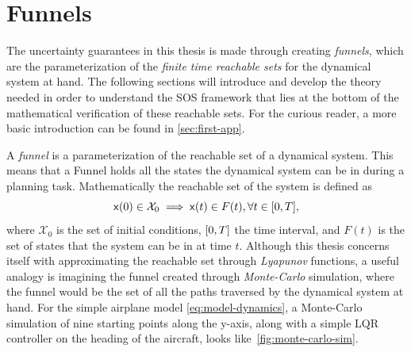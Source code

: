 \section{Funnels}
\label{sec:funnels}

The uncertainty guarantees in this thesis is made through creating
\textit{funnels}, which are the parameterization of the \textit{finite time
  reachable sets} for the dynamical system at hand. The following sections will
introduce and develop the theory needed in order to understand the \ac{SOS}
framework that lies at the bottom of the mathematical verification of these
reachable sets. For the curious reader, a more basic introduction can be found
in \cref{sec:first-app}.

A \textit{funnel} is a parameterization of the reachable set of a dynamical
system. This means that a Funnel holds all the states the dynamical system can
be in during a planning task. Mathematically the reachable set of the system is
defined as
\[
  {\mathbf{\mathsf{x}}}(0) \in \mathcal{X}_0 \implies {\mathbf{\mathsf{x}}}(t) \in F(t), \forall t \in
  \lbrack0,T\rbrack,
\]
where \(\mathcal{X}_0\) is the set of initial conditions, \(\lbrack0,T\rbrack\) the time
interval, and \(F(t)\) is the set of states that the system can be in at time
\(t\). Although this thesis concerns itself with approximating the reachable set
through \textit{Lyapunov} functions, a useful analogy is imagining the funnel
created through \textit{Monte-Carlo} simulation, where the funnel would be the
set of all the paths traversed by the dynamical system at hand. For the simple
airplane model \cref{eq:model-dynamics}, a Monte-Carlo simulation of nine
starting points along the y-axis, along with a simple \ac{LQR} controller on the
heading of the aircraft, looks like~\cref{fig:monte-carlo-sim}.

